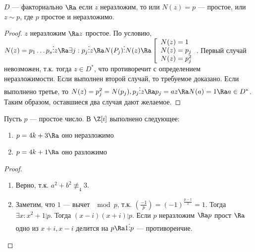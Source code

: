\begin{proposition}
    \(D\) --- факториально \(\Ra\) если \(z\) неразложим, то или \(N(z) = p\) --- простое, или \(z \sim p\), где \(p\) простое и неразложимо.
\end{proposition}
\begin{proof}
    \(z\) неразложим \(\Ra z\) простое. По условию, \(N(z) = p_1\dots p_s \vdots z \Ra \exists j: p_j \vdots z \Ra N(P_j) \vdots N(z) \Ra \left[\begin{array}{l}
        N(z) = 1 \\
        N(z) = p_j \\
        N(z) = p_j^2 \\ 
    \end{array}\right.\).
    Первый случай невозможен, т.к. тогда \(z \in D^*\), что противоречит с определением неразложимости. Если выполнен второй случай, то требуемое доказано. Если выполнено третье, то \(N(z) = p_j^2 = N(p_j), p_j \vdots z \Ra p_j = az \Ra N(a) = 1 \Ra a \in D^*\). Таким образом, оставшиеся два случая дают желаемое.
\end{proof}

\begin{theorem}
    Пусть \(p\) --- простое число. В \(\Z[i]\) выполнено следующее:
    \begin{enumerate}
        \item \(p = 4k + 3 \Ra\) оно неразложимо
        \item \(p = 4k + 1 \Ra\) оно разложимо
    \end{enumerate}
\end{theorem}
\begin{proof}
    \begin{enumerate}
        \item Верно, т.к. \(a^2 + b^2 \not\equiv_4 3\).
        \item Заметим, что \(1\) --- вычет \(\mod p\), т.к. \(\left( \frac{-1}{p} \right) = (-1)^{\frac{p - 1}{2}} = 1\). Тогда \(\exists x: x^2 + 1 \vdots p\). Тогда \((x - i)(x + i) \vdots p\). Если \(p\) неразложим \(\Ra p\) прост \(\Ra\) одно из \(x + i, x - i\) делится на \(p \Ra 1\vdots p\) --- противореичие.
    \end{enumerate}
\end{proof}

